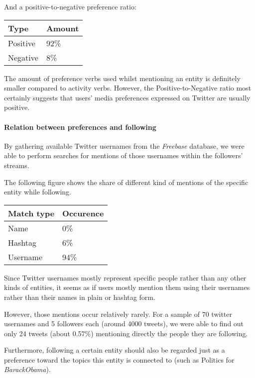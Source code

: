 And a positive-to-negative preference ratio:

\begin{center}
  \begin{tabular}{ | p{3cm}| p{2cm} | } \hline
    Type & Amount \\ \hline
    Positive & 92\% \\ \hline
    Negative & 8\% \\ \hline
  \end{tabular}
\end{center}

The amount of preference verbs used whilst mentioning an entity is definitely
smaller compared to activity verbs. However, the Positive-to-Negative ratio most
certainly suggests that users' media preferences expressed on Twitter are
usually positive.

\paragraph{Relation between preferences and following}
By gathering available Twitter usernames from the \textit{Freebase} database,
we were able to perform searches for mentions of those usernames within the followers' streams.

The following figure shows the share of different kind of mentions of the specific entity while following.

\begin{center}
  \begin{tabular}{ | p{3cm}| p{2cm} | } \hline
    Match type & Occurence \\ \hline
    Name & 0\% \\ \hline
    Hashtag & 6\% \\ \hline
	Username & 94\% \\ \hline
  \end{tabular}
\end{center}

Since Twitter usernames mostly represent specific people rather than any other kinds of entities, it seems as if users mostly
mention them using their usernames rather than their names in plain or hashtag form.

However, those mentions occur relatively rarely. For a sample of 70 twitter usernames and 5 followers each
(around 4000 tweets), we were able to find out only 24 tweets (about 0.57\%) mentioning directly the people they are following.

Furthermore, following a certain entity should also be regarded just as a preference toward the topics this entity is connected to (such as
Politics for \textit{BarackObama}).

